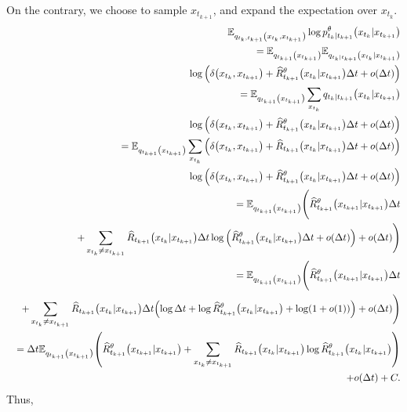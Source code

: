\documentclass{article}
\begin{document}
On the contrary, we choose to sample $x_{t_{k+1}}$, and expand the expectation over $x_{t_k}$.
\begin{eqnarray*}
  &&\mathbb{E}_{q_{t_k,t_{k+1}}\qty(x_{t_k},x_{t_{k+1}})}\log p^\theta_{t_k|t_{k+1}}\qty(x_{t_k}|x_{t_{k+1}}) \\
  &&= \mathbb{E}_{q_{t_{k+1}}\qty(x_{t_{k+1}})}\mathbb{E}_{q_{t_k|t_{k+1}}\qty(x_{t_k}|x_{t_{k+1}})}\\
  &&\log \qty(\delta\qty(x_{t_k},x_{t_{k+1}}) + \widehat{R}_{t_{k+1}}^\theta\qty(x_{t_k}|x_{t_{k+1}})\Delta t + o(\Delta t)) \\
  &&= \mathbb{E}_{q_{t_{k+1}}\qty(x_{t_{k+1}})}\sum_{x_{t_k}}q_{t_k|t_{k+1}}\qty(x_{t_k}|x_{t_{k+1}})\\
  &&\log \qty(\delta\qty(x_{t_k},x_{t_{k+1}}) + \widehat{R}_{t_{k+1}}^\theta\qty(x_{t_k}|x_{t_{k+1}})\Delta t + o(\Delta t)) \\
  &&= \mathbb{E}_{q_{t_{k+1}}\qty(x_{t_{k+1}})}\sum_{x_{t_k}}\qty(\delta\qty(x_{t_k},x_{t_{k+1}}) + \widehat{R}_{t_{k+1}}\qty(x_{t_k}|x_{t_{k+1}})\Delta t + o(\Delta t))\\
  &&\log \qty(\delta\qty(x_{t_k},x_{t_{k+1}}) + \widehat{R}_{t_{k+1}}^\theta\qty(x_{t_k}|x_{t_{k+1}})\Delta t + o(\Delta t)) \\
  &&= \mathbb{E}_{q_{t_{k+1}}\qty(x_{t_{k+1}})}\Bigg(\widehat{R}_{t_{k+1}}^\theta\qty(x_{t_{k+1}}|x_{t_{k+1}})\Delta t \\
  &&+ \sum_{x_{t_k}\neq x_{t_{k+1}}}\widehat{R}_{t_{k+1}}\qty(x_{t_k}|x_{t_{k+1}})\Delta t \log \qty(\widehat{R}_{t_{k+1}}^\theta\qty(x_{t_k}|x_{t_{k+1}})\Delta t + o(\Delta t)) + o(\Delta t)\Bigg) \\
  &&= \mathbb{E}_{q_{t_{k+1}}\qty(x_{t_{k+1}})}\Bigg(\widehat{R}_{t_{k+1}}^\theta\qty(x_{t_{k+1}}|x_{t_{k+1}})\Delta t \\
  &&+ \sum_{x_{t_k}\neq x_{t_{k+1}}}\widehat{R}_{t_{k+1}}\qty(x_{t_k}|x_{t_{k+1}})\Delta t \qty(\log\Delta t + \log \widehat{R}_{t_{k+1}}^\theta\qty(x_{t_k}|x_{t_{k+1}}) + \log(1 + o(1))) + o(\Delta t)\Bigg) \\
  &&= \Delta t\mathbb{E}_{q_{t_{k+1}}\qty(x_{t_{k+1}})}\qty(\widehat{R}_{t_{k+1}}^\theta\qty(x_{t_{k+1}}|x_{t_{k+1}}) + \sum_{x_{t_k}\neq x_{t_{k+1}}}\widehat{R}_{t_{k+1}}\qty(x_{t_k}|x_{t_{k+1}}) \log \widehat{R}_{t_{k+1}}^\theta\qty(x_{t_k}|x_{t_{k+1}})) \\
  &&+ o(\Delta t) + C.
\end{eqnarray*}
Thus,
\end{document}
